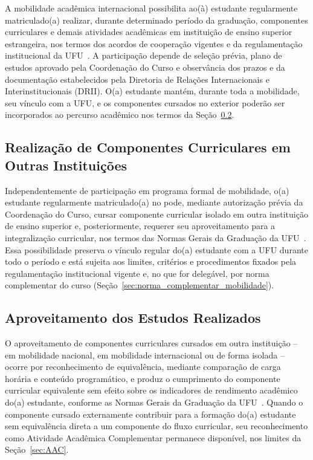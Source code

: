 A mobilidade acadêmica internacional possibilita ao(à) estudante regularmente matriculado(a) realizar, durante determinado período da graduação, componentes curriculares e demais atividades acadêmicas em instituição de ensino superior estrangeira, nos termos dos acordos de cooperação vigentes e da regulamentação institucional da UFU~\cite{ufu_congrad_112_2023}. A participação depende de seleção prévia, plano de estudos aprovado pela Coordenação do Curso e observância dos prazos e da documentação estabelecidos pela Diretoria de Relações Internacionais e Interinstitucionais (DRII). O(a) estudante mantém, durante toda a mobilidade, seu vínculo com a UFU, e os componentes cursados no exterior poderão ser incorporados ao percurso acadêmico nos termos da Seção~\ref{sec:mobilidade_aproveitamento}.

\subsection{Realização de Componentes Curriculares em Outras Instituições}

Independentemente de participação em programa formal de mobilidade, o(a) estudante regularmente matriculado(a) no \ppccurso pode, mediante autorização prévia da Coordenação do Curso, cursar componente curricular isolado em outra instituição de ensino superior e, posteriormente, requerer seu aproveitamento para a integralização curricular, nos termos das Normas Gerais da Graduação da UFU~\cite{ufu_congrad_46_2022}. Essa possibilidade preserva o vínculo regular do(a) estudante com a UFU durante todo o período e está sujeita aos limites, critérios e procedimentos fixados pela regulamentação institucional vigente e, no que for delegável, por norma complementar do curso (Seção~\ref{sec:norma_complementar_mobilidade}).

\subsection{Aproveitamento dos Estudos Realizados}
\label{sec:mobilidade_aproveitamento}

O aproveitamento de componentes curriculares cursados em outra instituição -- em mobilidade nacional, em mobilidade internacional ou de forma isolada -- ocorre por reconhecimento de equivalência, mediante comparação de carga horária e conteúdo programático, e produz o cumprimento do componente curricular equivalente sem efeito sobre os indicadores de rendimento acadêmico do(a) estudante, conforme as Normas Gerais da Graduação da UFU~\cite{ufu_congrad_46_2022}. Quando o componente cursado externamente contribuir para a formação do(a) estudante sem equivalência direta a um componente do fluxo curricular, seu reconhecimento como Atividade Acadêmica Complementar permanece disponível, nos limites da Seção~\ref{sec:AAC}.

